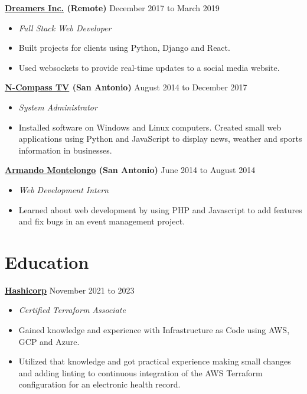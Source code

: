 \documentclass[10pt]{article}
\begin{document}
  \textbf{\href{https://thedreamers.us/}{Dreamers Inc.} (Remote)} \hfill {December 2017 to March 2019}
    \begin{itemize}
     \item[] \textit{Full Stack Web Developer}
     \item[] Built projects for clients using Python, Django and React.
     \item[] Used websockets to provide real-time updates to a social media website.
    \end{itemize}

   \textbf{\href{https://n-compass.tv/}{N-Compass TV} (San Antonio)} \hfill {August 2014 to December 2017}
    \begin{itemize}
        \item[] \textit{System Administrator}
        \item[] Installed software on Windows and Linux computers.
         Created small web applications using Python and JavaScript to display news, weather and sports information in businesses.
    \end{itemize}

   \textbf{\href{https://armandomontelongo.com/}{Armando Montelongo} (San Antonio)} \hfill {June 2014 to August 2014}
    \begin{itemize}
     \item[] \textit{Web Development Intern}
     \item[] Learned about web development by using PHP and Javascript to add features and fix bugs in an event management project.
    \end{itemize}

   \section*{Education}
   \noindent

  \textbf{\href{https://www.credly.com/badges/d4012af6-1c9f-4ca8-aa2a-931c2c3c8e5b}{Hashicorp}} \hfill {November 2021 to 2023}
   \begin{itemize}
     \item[] \textit{Certified Terraform Associate}
     \item[] Gained knowledge and experience with Infrastructure as Code using AWS, GCP and Azure.
     \item[] Utilized that knowledge and got practical experience making small changes and adding linting to continuous integration of the AWS Terraform configuration for an electronic health record.
    \end{itemize}
\end{document}
